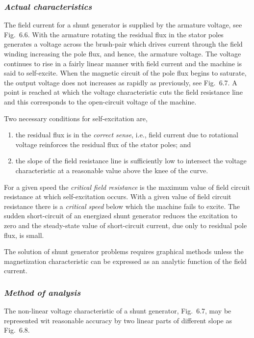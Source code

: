 \documentclass[a4paper,numbers=noenddot,12pt]{scrbook}
\begin{document}
        \subsubsection{\textit{Actual characteristics}}
        The field current for a shunt generator is supplied by the armature voltage, see Fig.\ 6.6. With the armature rotating the residual flux in the stator poles generates a voltage across the brush-pair which drives current through the field winding increasing the pole flux, and hence, the armature voltage. The voltage continues to rise in a fairly linear manner with field current and the machine is said to self-excite. When the magnetic circuit of the pole flux
        begins to saturate, the output voltage does not increases as rapidly as previously, see Fig.\ 6.7. A point is reached at which the voltage characteristic cuts the field resistance line and this corresponds to the open-circuit voltage of the machine.

        Two necessary conditions for self-excitation are,
        \begin{enumerate}
            \item the residual flux is in the \textit{correct sense}, i.e., field current due to rotational voltage reinforces the residual flux of the stator poles; and
            \item the slope of the field resistance line is sufficiently low to intersect the voltage characteristic at a reasonable value above the knee of the curve.
        \end{enumerate}
        For a given speed the \textit{critical field resistance} is the maximum value of field circuit resistance at which self-excitation occurs. With a given value of field circuit resistance there is a  \textit{critical speed} below which the machine fails to excite. The sudden short-circuit of an energized shunt generator reduces the excitation to zero and the steady-state value of short-circuit current, due only to residual pole flux, is small.

        The solution of shunt generator problems requires graphical methods unless the magnetization characteristic can be expressed as an analytic function of the field current.

        \subsubsection{\textit{Method of analysis}}
        The non-linear voltage characteristic of a shunt generator, Fig.\ 6.7, may be represented wit reasonable accuracy by two linear parts of different slope as Fig.\ 6.8.
\end{document}

